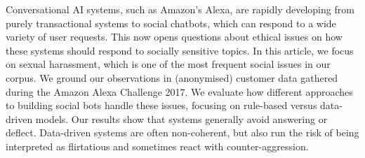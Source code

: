 Conversational AI systems, such as Amazon's Alexa, are rapidly  developing from purely transactional systems to social chatbots, which can respond to a wide variety of user requests. This now opens questions about ethical issues on how these systems should respond to socially sensitive topics. In this article, we focus on sexual harassment, which is one of the most frequent social issues in our corpus. We ground our observations in (anonymised) customer data gathered during the Amazon Alexa Challenge 2017. We evaluate how different approaches to building social bots handle these issues, focusing on rule-based versus data-driven models. Our results show that systems generally avoid answering or deflect. Data-driven systems are often non-coherent, but also run the risk of being interpreted as flirtatious and sometimes react with counter-aggression.
